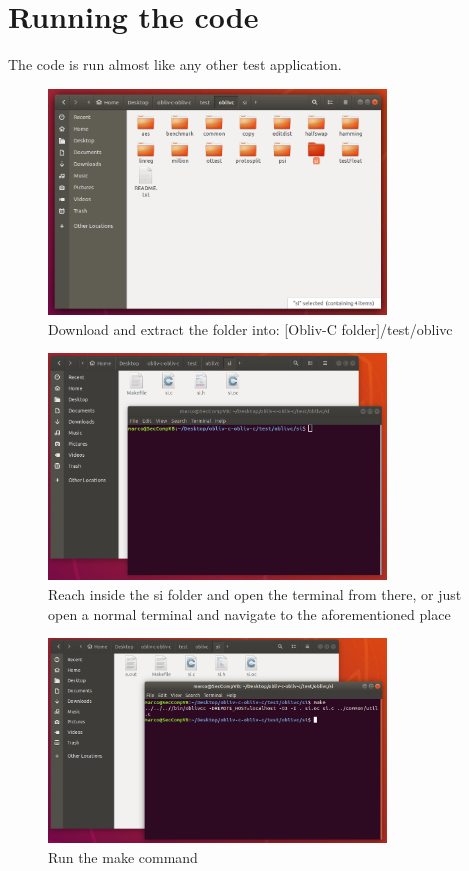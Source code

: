 \documentclass[a4paper]{article}
\begin{document}
\section{Running the code}

The code is run almost like any other test application.

\begin{figure}[H]
  \centering
  \includegraphics[width=0.8\textwidth]{testfolder.png}
  \caption{Download and extract the folder into: [Obliv-C folder]/test/oblivc}
\end{figure}

\begin{figure}[H]
  \centering
  \includegraphics[width=0.8\textwidth]{terminal.png}
  \caption{Reach inside the si folder and open the terminal from there, or just open a normal terminal and navigate to the aforementioned place}
\end{figure}

\begin{figure}[H]
  \centering
  \includegraphics[width=0.8\textwidth]{make.png}
  \caption{Run the make command}
\end{figure}
\end{document}
